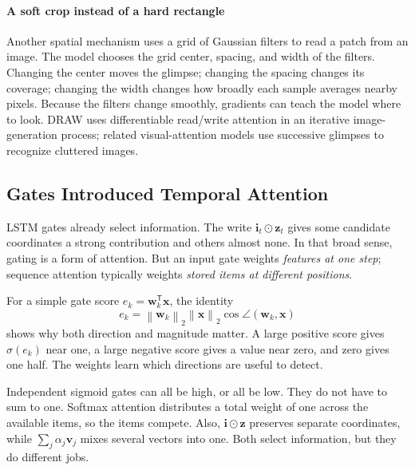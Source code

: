 \documentclass[11pt, oneside]{book}
\newcommand{\norm}[1]{\left\lVert #1 \right\rVert}
\newcommand{\T}{^{\mathsf{T}}}           %
\let\originalsubsection\subsection
\renewcommand{\subsection}{\Needspace{6\baselineskip}\originalsubsection}
\begin{document}
\paragraph{A soft crop instead of a hard rectangle} Another spatial mechanism uses a grid of Gaussian filters to read a patch from an image. The model chooses the grid center, spacing, and width of the filters. Changing the center moves the glimpse; changing the spacing changes its coverage; changing the width changes how broadly each sample averages nearby pixels. Because the filters change smoothly, gradients can teach the model where to look. DRAW uses differentiable read/write attention in an iterative image-generation process; related visual-attention models use successive glimpses to recognize cluttered images.

\subsection{Gates Introduced Temporal Attention}\label{sec:source-4-1-2}
LSTM gates already select information. The write $\mathbf{i}_t\odot\mathbf{z}_t$ gives some candidate coordinates a strong contribution and others almost none. In that broad sense, gating is a form of attention. But an input gate weights \emph{features at one step}; sequence attention typically weights \emph{stored items at different positions}.

For a simple gate score $e_k=\mathbf{w}_k\T\mathbf{x}$, the identity
\[
 e_k=\norm{\mathbf{w}_k}_2\norm{\mathbf{x}}_2\cos\angle(\mathbf{w}_k,\mathbf{x})
\]
shows why both direction and magnitude matter. A large positive score gives $\sigma(e_k)$ near one, a large negative score gives a value near zero, and zero gives one half. The weights learn which directions are useful to detect.

\begin{notebox}[title={Sigmoid gates and softmax weights are not the same}]
Independent sigmoid gates can all be high, or all be low. They do not have to sum to one. Softmax attention distributes a total weight of one across the available items, so the items compete. Also, $\mathbf{i}\odot\mathbf{z}$ preserves separate coordinates, while $\sum_j\alpha_j\mathbf{v}_j$ mixes several vectors into one. Both select information, but they do different jobs.
\end{notebox}
\end{document}
